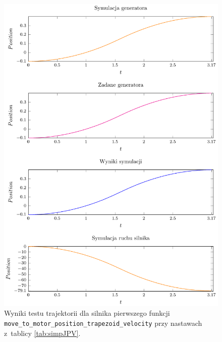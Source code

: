 \documentclass[a4paper, 12pt]{article}
\begin{document}
	\begin{figure}[H]
		\centering
		\includegraphics[scale=1.2]{raport_graphs/simpJPV.pdf}
		\caption{Wyniki testu trajektorii dla silnika pierwszego funkcji \texttt{move\_to\_motor\_position\_trapezoid\_velocity} przy nastawach z~tablicy \ref{tab:simpJPV}.}
		\label{fig:simpJPV}
	\end{figure}
\end{document}
